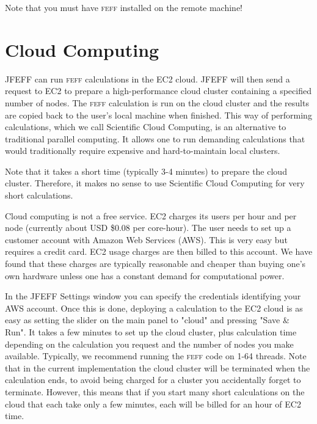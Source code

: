 \documentclass[11pt,oneside]{report} %
\newcommand{\program}[1]{\textsc{#1}}
\newcommand{\feff}{\program{feff}}
\begin{document}
Note that you must have {\feff} installed on the remote machine!  


\section{Cloud Computing}
\label{Sec:Cloud}

JFEFF can run {\feff} calculations in the EC2 cloud.  JFEFF will then send a request to EC2 to prepare a high-performance cloud cluster containing a specified number of nodes.  The {\feff} calculation is run on the cloud cluster and the results are copied back to the user's local machine when finished.  This way of performing calculations, which we call Scientific Cloud Computing, is an alternative to traditional parallel computing.  It allows one to run demanding calculations that would traditionally require expensive and hard-to-maintain local clusters.  

Note that it takes a short time (typically 3-4 minutes) to prepare the cloud cluster.  Therefore, it makes no sense to use Scientific Cloud Computing for very short calculations.

Cloud computing is not a free service.  EC2 charges its users per hour and per node (currently about USD \$0.08 per core-hour).  The user needs to set up a customer account with Amazon Web Services (AWS).  This is very easy but requires a credit card.  EC2 usage charges are then billed to this account.  We have found that these charges are typically reasonable and cheaper than buying one's own hardware unless one has a constant demand for computational power.  

In the JFEFF Settings window you can specify the credentials identifying your AWS account.  Once this is done, deploying a calculation to the EC2 cloud is as easy as setting the slider on the main panel to "cloud" and pressing "Save \& Run".  It takes a few minutes to set up the cloud cluster, plus calculation time depending on the calculation you request and the number of nodes you make available.  Typically, we recommend running the {\feff} code on 1-64 threads.  Note that in the current implementation the cloud cluster will be terminated when the calculation ends, to avoid being charged for a cluster you accidentally forget to terminate.  However, this means that if you start many short calculations on the cloud that each take only a few minutes, each will be billed for an hour of EC2 time.  
\end{document}
